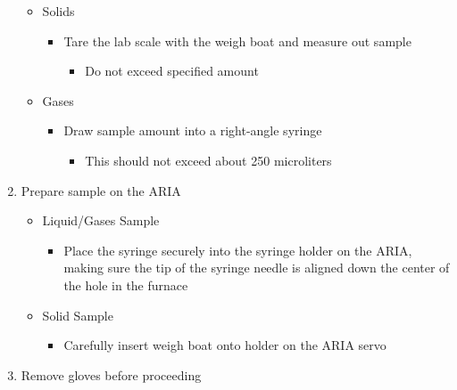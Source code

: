 \documentclass[letterpaper,11pt]{article}
\begin{document}
\begin{enumerate}
\begin{itemize}
        \item Solids
            \begin{itemize}
            \item Tare the lab scale with the weigh boat and measure out sample
                \begin{itemize}
                \item Do not exceed specified amount
                \end{itemize}
            \end{itemize}
            
        \item Gases
            \begin{itemize}
            \item Draw sample amount into a right-angle syringe  
                \begin{itemize}
                \item This should not exceed about 250 microliters
                \end{itemize}
            \end{itemize}
            
        \end{itemize}

     \item Prepare sample on the ARIA
		\begin{itemize}
		\item Liquid/Gases Sample
			\begin{itemize}
			\item Place the syringe securely into the syringe holder on the 
                ARIA, making sure the tip of the syringe 
                needle is aligned down the center of the hole in the furnace
			\end{itemize}
			
		\item Solid Sample
			\begin{itemize}
			\item Carefully insert weigh boat onto holder on the ARIA servo
			\end{itemize}
			
		\end{itemize}
			
	\item Remove gloves before proceeding
	

\end{enumerate}
\end{document}
